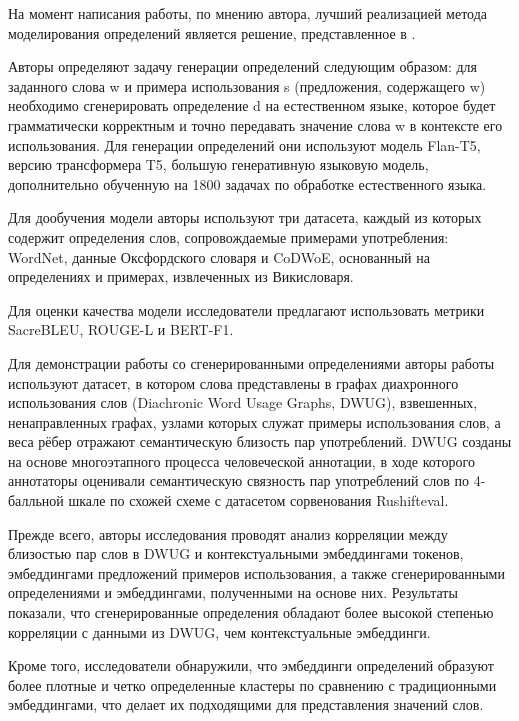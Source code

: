 \documentclass[LI,VKR]{HSEUniversity}
\begin{document}
На момент написания работы, по мнению автора, лучший реализацией метода моделирования определений
является решение, представленное в \cite{DefinitionGenerationMainArticle}.

Авторы определяют задачу генерации определений следующим образом: для заданного слова w и примера
использования s (предложения, содержащего w) необходимо сгенерировать определение d на
естественном языке, которое будет грамматически корректным и точно передавать значение слова
w в контексте его использования.
Для генерации определений они используют модель Flan-T5, версию трансформера T5,
большую генеративную языковую модель,
дополнительно обученную на 1800 задачах по обработке естественного языка.


Для дообучения модели авторы используют три датасета, каждый из которых содержит определения
слов, сопровождаемые примерами употребления: WordNet, данные Оксфордского словаря и CoDWoE,
основанный на определениях и примерах, извлеченных из Викисловаря.

Для оценки качества модели исследователи предлагают использовать метрики SacreBLEU, ROUGE-L и BERT-F1.

Для демонстрации работы со сгенерированными определениями авторы
работы используют датасет, в котором слова представлены в графах диахронного использования
слов (Diachronic Word Usage Graphs, DWUG), взвешенных, ненаправленных графах,
узлами которых служат примеры использования слов, а веса рёбер отражают семантическую
близость пар употреблений.
DWUG созданы на основе многоэтапного процесса человеческой аннотации, в ходе которого аннотаторы
оценивали семантическую связность пар употреблений слов по 4-балльной шкале
по схожей схеме с датасетом сорвенования Rushifteval.

Прежде всего, авторы исследования проводят анализ корреляции между близостью пар слов в DWUG
и контекстуальными эмбеддингами токенов, эмбеддингами предложений примеров использования, а также
сгенерированными определениями и эмбеддингами, полученными на основе них.
Результаты показали, что сгенерированные определения обладают более высокой степенью
корреляции с данными из DWUG, чем контекстуальные эмбеддинги.

Кроме того, исследователи обнаружили, что эмбеддинги определений образуют более плотные и четко определенные
кластеры по сравнению с традиционными эмбеддингами, что делает их
подходящими для представления значений слов.
\end{document}
